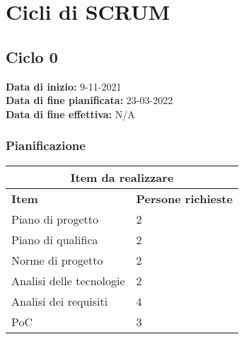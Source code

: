 \documentclass[a4paper, 12pt]{article}
\begin{document}
\section{Cicli di SCRUM}

\subsection{Ciclo 0}
\textbf{Data di inizio:} 9-11-2021\\
\textbf{Data di fine pianificata:} 23-03-2022\\
\textbf{Data di fine effettiva:} N/A

\subsubsection{Pianificazione}\mbox{}


\begin{center}
    \begin{tabularx}{\textwidth}{|X|X|}
        \hline
        \multicolumn{2}{|c|}{\textbf{Item da realizzare}}\\
        \hline
        \hline
        \textbf{Item} & \textbf{Persone richieste}\\
        \hline
        Piano di progetto & 2\\
        \hline
        Piano di qualifica & 2\\
        \hline
        Norme di progetto & 2\\
        \hline
        Analisi delle tecnologie & 2\\
        \hline
        Analisi dei requisiti & 4\\
        \hline
        PoC & 3\\
        \hline
    \end{tabularx}\\[8pt]
    \mbox{}\\
\end{center}
\end{document}
